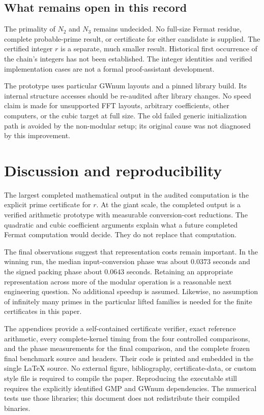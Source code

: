 \documentclass[11pt,a4paper]{article}
\theoremstyle{definition}
\begin{document}
\subsection{What remains open in this record}

The primality of $N_2$ and $N_3$ remains undecided. No full-size Fermat
residue, complete probable-prime result, or certificate for either candidate
is supplied. The certified integer $r$ is a separate, much smaller result.
Historical first occurrence of the chain's integers has not been established.
The integer identities and verified implementation cases are not a formal
proof-assistant development.

The prototype uses particular GWnum layouts and a pinned library build.
Its internal structure accesses should be re-audited after library changes.
No speed claim is made for unsupported FFT layouts, arbitrary coefficients,
other computers, or the cubic target at full size. The old failed generic
initialization path is avoided by the non-modular setup; its original cause
was not diagnosed by this improvement.

\section{Discussion and reproducibility}
\label{sec:discussion}

The largest completed mathematical output in the audited computation is
the explicit prime certificate for $r$. At the giant scale, the completed
output is a verified arithmetic prototype with measurable conversion-cost
reductions. The quadratic and cubic coefficient arguments explain what a
future completed Fermat computation would decide. They do not replace that
computation.

The final observations suggest that representation costs remain important.
In the winning run, the median input-conversion phase was about $0.0373$
seconds and the signed packing phase about $0.0643$ seconds. Retaining an
appropriate representation across more of the modular operation is a
reasonable next engineering question. No additional speedup is assumed.
Likewise, no assumption of infinitely many primes in the particular lifted
families is needed for the finite certificates in this paper.

The appendices provide a self-contained certificate verifier, exact reference
arithmetic, every complete-kernel timing from the four controlled comparisons,
and the phase measurements for the final comparison,
and the complete frozen final benchmark source and headers. Their code is
printed and embedded in the single LaTeX source. No external figure,
bibliography, certificate-data, or custom style file is required to compile
the paper. Reproducing the executable still requires the explicitly identified
GMP and GWnum dependencies. The numerical tests use those libraries; this
document does not redistribute their compiled binaries.
\end{document}
